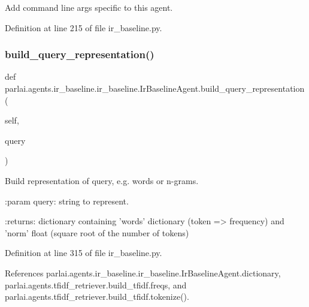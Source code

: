 \begin{DoxyVerb}Add command line args specific to this agent.\end{DoxyVerb}
 

Definition at line 215 of file ir\+\_\+baseline.\+py.

\mbox{\label{classparlai_1_1agents_1_1ir__baseline_1_1ir__baseline_1_1IrBaselineAgent_a87f02e724544fa1531486c1f8f0e2f68}} 
\subsubsection{\texorpdfstring{build\+\_\+query\+\_\+representation()}{build\_query\_representation()}}
{\footnotesize\ttfamily def parlai.\+agents.\+ir\+\_\+baseline.\+ir\+\_\+baseline.\+Ir\+Baseline\+Agent.\+build\+\_\+query\+\_\+representation (\begin{DoxyParamCaption}\item[{}]{self,  }\item[{}]{query }\end{DoxyParamCaption})}

\begin{DoxyVerb}Build representation of query, e.g. words or n-grams.

:param query: string to represent.

:returns: dictionary containing 'words' dictionary (token => frequency)
  and 'norm' float (square root of the number of tokens)
\end{DoxyVerb}
 

Definition at line 315 of file ir\+\_\+baseline.\+py.



References parlai.\+agents.\+ir\+\_\+baseline.\+ir\+\_\+baseline.\+Ir\+Baseline\+Agent.\+dictionary, parlai.\+agents.\+tfidf\+\_\+retriever.\+build\+\_\+tfidf.\+freqs, and parlai.\+agents.\+tfidf\+\_\+retriever.\+build\+\_\+tfidf.\+tokenize().



